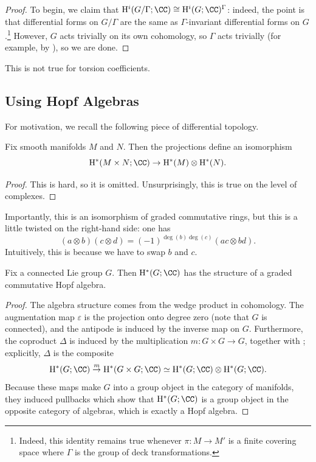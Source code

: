 \documentclass[../notes.tex]{subfiles}
\begin{document}
\begin{proof}
	To begin, we claim that $\mathrm H^i(G/\Gamma;\CC)\cong\mathrm H^i(G;\CC)^\Gamma$: indeed, the point is that differential forms on $G/\Gamma$ are the same as $\Gamma$-invariant differential forms on $G$.\footnote{Indeed, this identity remains true whenever $\pi\colon M\to M'$ is a finite covering space where $\Gamma$ is the group of deck transformations.} However, $G$ acts trivially on its own cohomology, so $\Gamma$ acts trivially (for example, by ), so we are done.
\end{proof}
\begin{remark}
	This is not true for torsion coefficients.
\end{remark}

\subsection{Using Hopf Algebras}
For motivation, we recall the following piece of differential topology.
\begin{theorem} \label{thm:kunneth}
	Fix smooth manifolds $M$ and $N$. Then the projections define an isomorphism
	\[\mathrm H^*(M\times N;\CC)\to\mathrm H^*(M)\otimes\mathrm H^*(N).\]
\end{theorem}
\begin{proof}
	This is hard, so it is omitted. Unsurprisingly, this is true on the level of complexes.
\end{proof}
\begin{remark}
	Importantly, this is an isomorphism of graded commutative rings, but this is a little twisted on the right-hand side: one has
	\[(a\otimes b)(c\otimes d)=(-1)^{\deg(b)\deg(c)}(ac\otimes bd).\]
	Intuitively, this is because we have to swap $b$ and $c$.
\end{remark}
\begin{corollary} \label{cor:cohomology-is-hopf}
	Fix a connected Lie group $G$. Then $\mathrm H^*(G;\CC)$ has the structure of a graded commutative Hopf algebra.
\end{corollary}
\begin{proof}
	The algebra structure comes from the wedge product in cohomology. The augmentation map $\varepsilon$ is the projection onto degree zero (note that $G$ is connected), and the antipode is induced by the inverse map on $G$. Furthermore, the coproduct $\Delta$ is induced by the multiplication $m\colon G\times G\to G$, together with ; explicitly, $\Delta$ is the composite
	\[\mathrm H^*(G;\CC)\stackrel m\to\mathrm H^*(G\times G;\CC)\simeq\mathrm H^*(G;\CC)\otimes\mathrm H^*(G;\CC).\]
	Because these maps make $G$ into a group object in the category of manifolds, they induced pullbacks which show that $\mathrm H^*(G;\CC)$ is a group object in the opposite category of algebras, which is exactly a Hopf algebra.
\end{proof}
\end{document}
